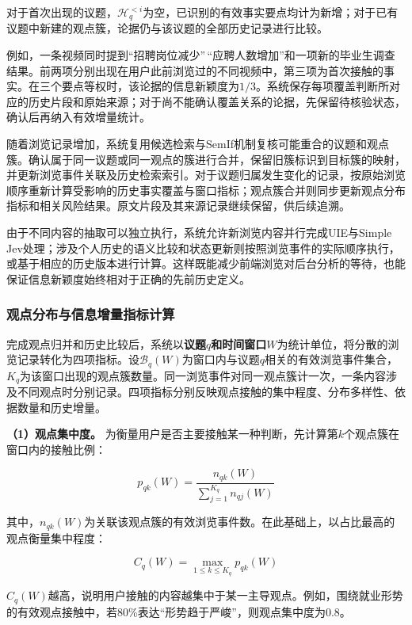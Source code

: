 对于首次出现的议题，\(\mathcal H_q^{<i}\)为空，已识别的有效事实要点均计为新增；对于已有议题中新建的观点簇，论据仍与该议题的全部历史记录进行比较。

例如，一条视频同时提到``招聘岗位减少''\,``应聘人数增加''和一项新的毕业生调查结果。前两项分别出现在用户此前浏览过的不同视频中，第三项为首次接触的事实。在三个要点等权时，该论据的信息新颖度为\(1/3\)。系统保存每项覆盖判断所对应的历史片段和原始来源；对于尚不能确认覆盖关系的论据，先保留待核验状态，确认后再纳入有效增量统计。

随着浏览记录增加，系统复用候选检索与SemIf机制复核可能重合的议题和观点簇。确认属于同一议题或同一观点的簇进行合并，保留旧簇标识到目标簇的映射，并更新浏览事件关联及历史检索索引。对于议题归属发生变化的记录，按原始浏览顺序重新计算受影响的历史事实覆盖与窗口指标；观点簇合并则同步更新观点分布指标和相关风险结果。原文片段及其来源记录继续保留，供后续追溯。

由于不同内容的抽取可以独立执行，系统允许新浏览内容并行完成UIE与Simple Jev处理；涉及个人历史的语义比较和状态更新则按照浏览事件的实际顺序执行，或基于相应的历史版本进行计算。这样既能减少前端浏览对后台分析的等待，也能保证信息新颖度始终相对于正确的先前历史定义。

\subsubsection{观点分布与信息增量指标计算}\label{section:2.2.4}

完成观点归并和历史比较后，系统以\textbf{议题\(q\)和时间窗口\(W\)}为统计单位，将分散的浏览记录转化为四项指标。设\(\mathcal B_q(W)\)为窗口内与议题\(q\)相关的有效浏览事件集合，\(K_q\)为该窗口出现的观点簇数量。同一浏览事件对同一观点簇计一次，一条内容涉及不同观点时分别记录。四项指标分别反映观点接触的集中程度、分布多样性、依据数量和历史增量。

\textbf{（1）观点集中度。} 为衡量用户是否主要接触某一种判断，先计算第\(k\)个观点簇在窗口内的接触比例：

\begin{equation}
p_{qk}(W)=\frac{n_{qk}(W)}{\sum_{j=1}^{K_q}n_{qj}(W)}
\label{eq:2-3}
\end{equation}

其中，\(n_{qk}(W)\)为关联该观点簇的有效浏览事件数。在此基础上，以占比最高的观点衡量集中程度：

\begin{equation}
C_q(W)=\max_{1\leq k\leq K_q}p_{qk}(W)
\label{eq:2-4}
\end{equation}

\(C_q(W)\)越高，说明用户接触的内容越集中于某一主导观点。例如，围绕就业形势的有效观点接触中，若80\%表达``形势趋于严峻''，则观点集中度为0.8。

